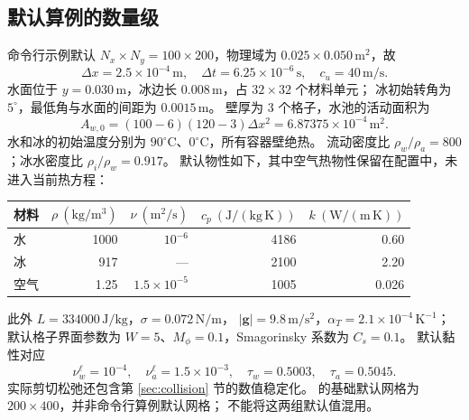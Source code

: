 \subsection{默认算例的数量级}
\label{sec:defaults}
命令行示例默认 $N_x\times N_y=100\times200$，物理域为
$0.025\times0.050\,\mathrm{m^2}$，故
\begin{equation}
 \Delta x=2.5\times10^{-4}\,\mathrm m,\quad
 \Delta t=6.25\times10^{-6}\,\mathrm s,\quad
 c_u=40\,\mathrm{m/s}.
\end{equation}
水面位于 $y=0.030\,\mathrm m$，冰边长 $0.008\,\mathrm m$，占 $32\times32$ 个材料单元；
冰初始转角为 $5^\circ$，最低角与水面的间距为 $0.0015\,\mathrm m$。
壁厚为 3 个格子，水池的活动面积为
\begin{equation}
 A_{w,0}=(100-6)(120-3)\Delta x^2=6.87375\times10^{-4}\,\mathrm{m^2}.
\end{equation}
水和冰的初始温度分别为 $90^\circ\mathrm C$、$0^\circ\mathrm C$，所有容器壁绝热。
流动密度比 $\rho_w/\rho_a=800$；冰水密度比 $\rho_i/\rho_w=0.917$。
默认物性如下，其中空气热物性保留在配置中，未进入当前热方程：
\begin{center}
\begin{tabular}{lrrrr}
\toprule
材料 & $\rho\ (\mathrm{kg/m^3})$ & $\nu\ (\mathrm{m^2/s})$
 & $c_p\ (\mathrm{J/(kg\,K)})$ & $k\ (\mathrm{W/(m\,K)})$\\
\midrule
水 & 1000 & $10^{-6}$ & 4186 & 0.60\\
冰 & 917 & --- & 2100 & 2.20\\
空气 & 1.25 & $1.5\times10^{-5}$ & 1005 & 0.026\\
\bottomrule
\end{tabular}
\end{center}
此外 $L=334000\,\mathrm{J/kg}$，$\sigma=0.072\,\mathrm{N/m}$，
$|\bm g|=9.8\,\mathrm{m/s^2}$，$\alpha_T=2.1\times10^{-4}\,\mathrm{K^{-1}}$；
默认格子界面参数为 $W=5$、$M_\phi=0.1$，Smagorinsky 系数为 $C_s=0.1$。
默认黏性对应
\begin{equation}
 \nu_w^\ell=10^{-4},\quad\nu_a^\ell=1.5\times10^{-3},\quad
 \tau_w=0.5003,\quad\tau_a=0.5045.
\end{equation}
实际剪切松弛还包含第 \ref{sec:collision} 节的数值稳定化。
 的基础默认网格为 $200\times400$，并非命令行算例默认网格；
不能将这两组默认值混用。
